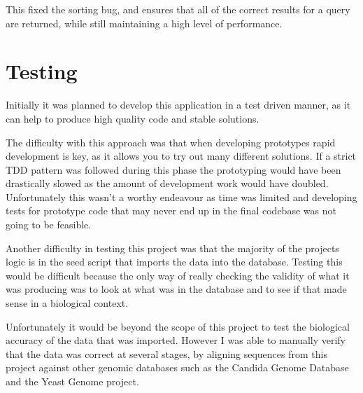 This fixed the sorting bug, and ensures that all of the correct results for a query are returned, while still maintaining a high level of performance. 


% 
% 
% 

\section{Testing}
Initially it was planned to develop this application in a test driven manner, as it can help to produce high quality code and stable solutions. 

The difficulty with this approach was that when developing prototypes rapid development is key, as it allows you to try out many different solutions. If a strict TDD pattern was followed during this phase the prototyping would have been drastically slowed as the amount of development work would have doubled. Unfortunately this wasn't a worthy endeavour as time was limited and developing tests for prototype code that may never end up in the final codebase was not going to be feasible.

Another difficulty in testing this project was that the majority of the projects logic is in the seed script that imports the data into the database. Testing this would be difficult because the only way of really checking the validity of what it was producing was to look at what was in the database and to see if that made sense in a biological context. 

Unfortunately it would be beyond the scope of this project to test the biological accuracy of the data that was imported. However I was able to manually verify that the data was correct at several stages, by aligning sequences from this project against other genomic databases such as the Candida Genome Database\cite{cgd} and the Yeast Genome\cite{sgd} project. 

